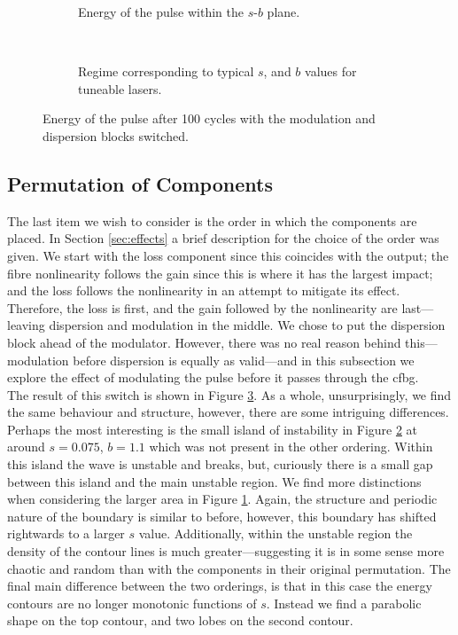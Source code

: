 \begin{figure}[p]
\centering
\begin{subfigure}{\textwidth}

\caption{Energy of the pulse within the $s$-$b$ plane.}
\label{fig:switchbig}
\end{subfigure} \\
\begin{subfigure}{\textwidth}

\caption{Regime corresponding to typical $s$, and $b$ values for tuneable lasers.}
\label{fig:switchzoom}
\end{subfigure}
\caption{Energy of the pulse after 100 cycles with the modulation and dispersion blocks switched.}
\label{fig:switch}
\end{figure}

\subsection{Permutation of Components}
The last item we wish to consider is the order in which the components are placed. In Section \ref{sec:effects} a brief description for the choice of the order was given. We start with the loss component since this coincides with the output; the fibre nonlinearity follows the gain since this is where it has the largest impact; and the loss follows the nonlinearity in an attempt to mitigate its effect. Therefore, the loss is first, and the gain followed by the nonlinearity are last---leaving dispersion and modulation in the middle. We chose to put the dispersion block ahead of the modulator. However, there was no real reason behind this---modulation before dispersion is equally as valid---and in this subsection we explore the effect of modulating the pulse before it passes through the \gls{cfbg}. \\

The result of this switch is shown in Figure \ref{fig:switch}. As a whole, unsurprisingly, we find the same behaviour and structure, however, there are some intriguing differences. Perhaps the most interesting is the small island of instability in Figure \ref{fig:switchzoom} at around $s = 0.075$, $b = 1.1$ which was not present in the other ordering. Within this island the wave is unstable and breaks, but, curiously there is a small gap between this island and the main unstable region. We find more distinctions when considering the larger area in Figure \ref{fig:switchbig}. Again, the structure and periodic nature of the boundary is similar to before, however, this boundary has shifted rightwards to a larger $s$ value. Additionally, within the unstable region the density of the contour lines is much greater---suggesting it is in some sense more chaotic and random than with the components in their original permutation. The final main difference between the two orderings, is that in this case the energy contours are no longer monotonic functions of $s$. Instead we find a parabolic shape on the top contour, and two lobes on the second contour. \\

